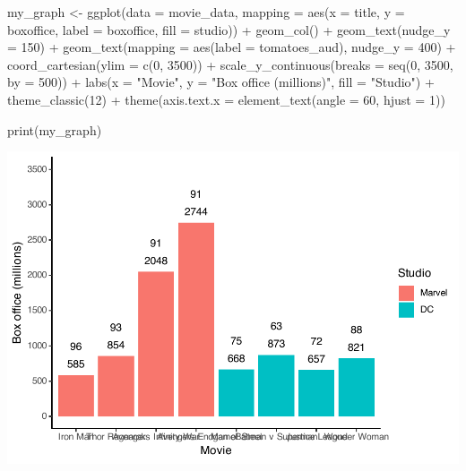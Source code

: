 \documentclass[
]{krantz}
\makeatletter
\newenvironment{Shaded}{\begin{snugshade}}{\end{snugshade}}
\newcommand{\AttributeTok}[1]{\textcolor[rgb]{0.61,0.61,0.61}{#1}}
\newcommand{\DecValTok}[1]{\textcolor[rgb]{0.06,0.06,0.06}{#1}}
\newcommand{\FunctionTok}[1]{\textcolor[rgb]{0,0,0}{#1}}
\newcommand{\NormalTok}[1]{#1}
\newcommand{\OtherTok}[1]{\textcolor[rgb]{0.37,0.37,0.37}{#1}}
\newcommand{\SpecialCharTok}[1]{\textcolor[rgb]{0,0,0}{#1}}
\newcommand{\StringTok}[1]{\textcolor[rgb]{0.5,0.5,0.5}{#1}}
\newenvironment{kframe}{%
\medskip{}
\setlength{\fboxsep}{.8em}
 \def\at@end@of@kframe{}%
 \ifinner\ifhmode%
  \def\at@end@of@kframe{\end{minipage}}%
  \begin{minipage}{\columnwidth}%
 \fi\fi%
 \def\FrameCommand##1{\hskip\@totalleftmargin \hskip-\fboxsep
 \colorbox{shadecolor}{##1}\hskip-\fboxsep
     \hskip-\linewidth \hskip-\@totalleftmargin \hskip\columnwidth}%
 \MakeFramed {\advance\hsize-\width
   \@totalleftmargin\z@ \linewidth\hsize
   \@setminipage}}%
 {\par\unskip\endMakeFramed%
 \at@end@of@kframe}
\renewenvironment{Shaded}{\begin{kframe}}{\end{kframe}}
\makeatother
\begin{document}
\begin{Shaded}
\begin{Highlighting}[]
\NormalTok{my\_graph }\OtherTok{\textless{}{-}} \FunctionTok{ggplot}\NormalTok{(}\AttributeTok{data =}\NormalTok{ movie\_data,}
           \AttributeTok{mapping =} \FunctionTok{aes}\NormalTok{(}\AttributeTok{x =}\NormalTok{ title,}
                         \AttributeTok{y =}\NormalTok{ boxoffice,}
                         \AttributeTok{label =}\NormalTok{ boxoffice, }
                         \AttributeTok{fill =}\NormalTok{ studio)) }\SpecialCharTok{+}
  \FunctionTok{geom\_col}\NormalTok{() }\SpecialCharTok{+}
  \FunctionTok{geom\_text}\NormalTok{(}\AttributeTok{nudge\_y =} \DecValTok{150}\NormalTok{)  }\SpecialCharTok{+}
  \FunctionTok{geom\_text}\NormalTok{(}\AttributeTok{mapping =} \FunctionTok{aes}\NormalTok{(}\AttributeTok{label =}\NormalTok{ tomatoes\_aud), }
            \AttributeTok{nudge\_y =} \DecValTok{400}\NormalTok{) }\SpecialCharTok{+}
  \FunctionTok{coord\_cartesian}\NormalTok{(}\AttributeTok{ylim =} \FunctionTok{c}\NormalTok{(}\DecValTok{0}\NormalTok{, }\DecValTok{3500}\NormalTok{)) }\SpecialCharTok{+}
  \FunctionTok{scale\_y\_continuous}\NormalTok{(}\AttributeTok{breaks =} \FunctionTok{seq}\NormalTok{(}\DecValTok{0}\NormalTok{, }\DecValTok{3500}\NormalTok{, }\AttributeTok{by =} \DecValTok{500}\NormalTok{)) }\SpecialCharTok{+}
  \FunctionTok{labs}\NormalTok{(}\AttributeTok{x =} \StringTok{"Movie"}\NormalTok{,}
       \AttributeTok{y =} \StringTok{"Box office (millions)"}\NormalTok{,}
       \AttributeTok{fill =} \StringTok{"Studio"}\NormalTok{) }\SpecialCharTok{+}
  \FunctionTok{theme\_classic}\NormalTok{(}\DecValTok{12}\NormalTok{) }\SpecialCharTok{+}
  \FunctionTok{theme}\NormalTok{(}\AttributeTok{axis.text.x =} \FunctionTok{element\_text}\NormalTok{(}\AttributeTok{angle =} \DecValTok{60}\NormalTok{, }
                                   \AttributeTok{hjust =} \DecValTok{1}\NormalTok{))  }

\FunctionTok{print}\NormalTok{(my\_graph)}
\end{Highlighting}
\end{Shaded}

\includegraphics[width=0.65\linewidth]{bookdown_files/figure-latex/unnamed-chunk-125-1}
\end{document}
